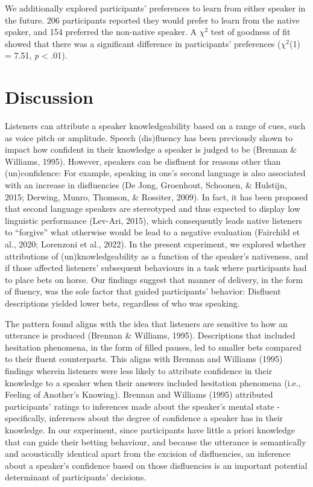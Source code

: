 \documentclass[
  man,floatsintext]{apa7}
\begin{document}
We additionally explored participants' preferences to learn from either speaker in the future. 206 participants reported they would prefer to learn from the native spaker, and 154 preferred the non-native speaker. A \(\chi^2\) test of goodness of fit showed that there was a significant difference in participants' preferences (\(\chi^2\)(1) = 7.51, \emph{p} \textless{} .01).

\hypertarget{discussion}{%
\section{Discussion}\label{discussion}}

Listeners can attribute a speaker knowledgeability based on a range of cues, such as voice pitch or amplitude. Speech (dis)fluency has been previously shown to impact how confident in their knowledge a speaker is judged to be (Brennan \& Williams, 1995). However, speakers can be disfluent for reasons other than (un)confidence: For example, speaking in one's second language is also associated with an increase in disfluencies (De Jong, Groenhout, Schoonen, \& Hulstijn, 2015; Derwing, Munro, Thomson, \& Rossiter, 2009). In fact, it has been proposed that second language speakers are stereotyped and thus expected to display low linguistic performance (Lev-Ari, 2015), which consequently leads native listeners to ``forgive'' what otherwise would be lead to a negative evaluation (Fairchild et al., 2020; Lorenzoni et al., 2022). In the present experiment, we explored whether attributions of (un)knowledgeability as a function of the speaker's nativeness, and if those affected listeners' subsequent behaviours in a task where participants had to place bets on horse. Our findings suggest that manner of delivery, in the form of fluency, was the sole factor that guided participants' behavior: Disfluent descriptions yielded lower bets, regardless of who was speaking.

The pattern found aligns with the idea that listeners are sensitive to how an utterance is produced (Brennan \& Williams, 1995). Descriptions that included hesitation phenomena, in the form of filled pauses, led to smaller bets compared to their fluent counterparts. This aligns with Brennan and Williams (1995) findings wherein listeners were less likely to attribute confidence in their knowledge to a speaker when their answers included hesitation phenomena (i.e., Feeling of Another's Knowing). Brennan and Williams (1995) attributed participants' ratings to inferences made about the speaker's mental state - specifically, inferences about the degree of confidence a speaker has in their knowledge. In our experiment, since participants have little a priori knowledge that can guide their betting behaviour, and because the utterance is semantically and acoustically identical apart from the excision of disfluencies, an inference about a speaker's confidence based on those disfluencies is an important potential determinant of participants' decisions.
\end{document}
